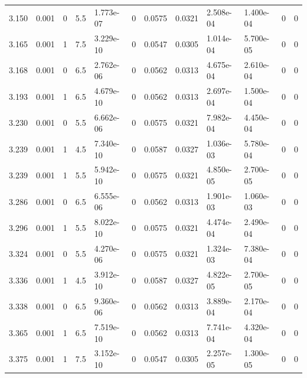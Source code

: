 \documentclass[preview]{standalone}
\begin{document}
{{{\begin{tabular}{L{1.2cm}C{1.2cm} C{0.3cm}C{0.5cm} C{1.4cm}C{1.4cm} C{1.4cm}C{1.4cm} C{1.6cm}C{1.6cm} C{1.6cm}C{1.6cm}}
  3.150  &  0.001  & 0     & 5.5 &  1.773e-07  & 0  &  0.0575&   0.0321& 2.508e-04 & 1.400e-04   &  0 & 0  \\ 
  3.165  &  0.001  & 1     & 7.5 &  3.229e-10  & 0  &  0.0547&   0.0305& 1.014e-04 & 5.700e-05   &  0 & 0  \\ 
  3.168  &  0.001  & 0     & 6.5 &  2.762e-06  & 0  &  0.0562&   0.0313& 4.675e-04 & 2.610e-04   &  0 & 0  \\ 
  3.193  &  0.001  & 1     & 6.5 &  4.679e-10  & 0  &  0.0562&   0.0313& 2.697e-04 & 1.500e-04   &  0 & 0  \\ 
  3.230  &  0.001  & 0     & 5.5 &  6.662e-06  & 0  &  0.0575&   0.0321& 7.982e-04 & 4.450e-04   &  0 & 0  \\ 
  3.239  &  0.001  & 1     & 4.5 &  7.340e-10  & 0  &  0.0587&   0.0327& 1.036e-03 & 5.780e-04   &  0 & 0  \\ 
  3.239  &  0.001  & 1     & 5.5 &  5.942e-10  & 0  &  0.0575&   0.0321& 4.850e-05 & 2.700e-05   &  0 & 0  \\ 
  3.286  &  0.001  & 0     & 6.5 &  6.555e-06  & 0  &  0.0562&   0.0313& 1.901e-03 & 1.060e-03   &  0 & 0  \\ 
  3.296  &  0.001  & 1     & 5.5 &  8.022e-10  & 0  &  0.0575&   0.0321& 4.474e-04 & 2.490e-04   &  0 & 0  \\ 
  3.324  &  0.001  & 0     & 5.5 &  4.270e-06  & 0  &  0.0575&   0.0321& 1.324e-03 & 7.380e-04   &  0 & 0  \\ 
  3.336  &  0.001  & 1     & 4.5 &  3.912e-10  & 0  &  0.0587&   0.0327& 4.822e-05 & 2.700e-05   &  0 & 0  \\ 
  3.338  &  0.001  & 0     & 6.5 &  9.360e-06  & 0  &  0.0562&   0.0313& 3.889e-04 & 2.170e-04   &  0 & 0  \\ 
  3.365  &  0.001  & 1     & 6.5 &  7.519e-10  & 0  &  0.0562&   0.0313& 7.741e-04 & 4.320e-04   &  0 & 0  \\ 
  3.375  &  0.001  & 1     & 7.5 &  3.152e-10  & 0  &  0.0547&   0.0305& 2.257e-05 & 1.300e-05   &  0 & 0  \\ 
\hline 
\end{tabular} 

}}}
\end{document}
